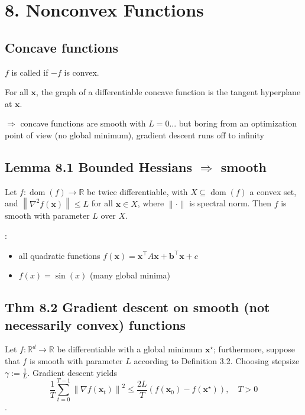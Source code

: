 \section*{8. Nonconvex Functions}
\subsection*{Concave functions}
$f$ is called  if $-f$ is convex.

For all $\mathbf{x}$, the graph of a differentiable concave function is  the tangent hyperplane at $\mathbf{x}$.

$\Rightarrow$ concave functions are smooth with $L=0$... but boring from an optimization point of view (no global minimum), gradient descent runs off to infinity



\subsection*{Lemma 8.1 Bounded Hessians $\Rightarrow$ smooth}
Let $f: \operatorname{dom}(f) \rightarrow \mathbb{R}$ be twice differentiable, with $X \subseteq \operatorname{dom}(f)$ a convex set, and $\left\|\nabla^{2} f(\mathbf{x})\right\| \leq L$ for all $\mathbf{x} \in X$, where $\|\cdot\|$ is spectral norm. Then $f$ is smooth with parameter $L$ over $X$.

:
\begin{itemize}[leftmargin=*]
    \item all quadratic functions $f(\mathbf{x})=\mathbf{x}^{\top} A \mathbf{x}+\mathbf{b}^{\top} \mathbf{x}+c$
    \item $f(x)=\sin (x)$ (many global minima)
\end{itemize}



\subsection*{Thm 8.2 Gradient descent on smooth (not necessarily convex) functions}
Let $f: \mathbb{R}^{d} \rightarrow \mathbb{R}$ be differentiable with a global minimum $\mathbf{x}^{\star}$; furthermore, suppose that $f$ is smooth with parameter $L$ according to Definition 3.2. Choosing stepsize
$
\gamma:=\frac{1}{L}
$. Gradient descent yields
$$
\frac{1}{T} \sum_{t=0}^{T-1}\left\|\nabla f\left(\mathbf{x}_{t}\right)\right\|^{2} \leq \frac{2 L}{T}\left(f\left(\mathbf{x}_{0}\right)-f\left(\mathbf{x}^{\star}\right)\right), \quad T>0
$$.

